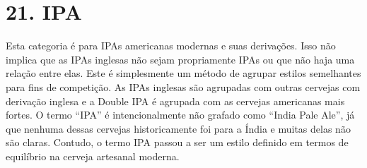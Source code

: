 \section*{21. IPA}

Esta categoria é para IPAs americanas modernas e suas derivações. Isso não implica que as IPAs inglesas não sejam propriamente IPAs ou que não haja uma relação entre elas. Este é simplesmente um método de agrupar estilos semelhantes para fins de competição. As IPAs inglesas são agrupadas com outras cervejas com derivação inglesa e a Double IPA é agrupada com as cervejas americanas mais fortes. O termo “IPA” é intencionalmente não grafado como “India Pale Ale”, já que nenhuma dessas cervejas historicamente foi para a Índia e muitas delas não são claras. Contudo, o termo IPA passou a ser um estilo definido em termos de equilíbrio na cerveja artesanal moderna.
